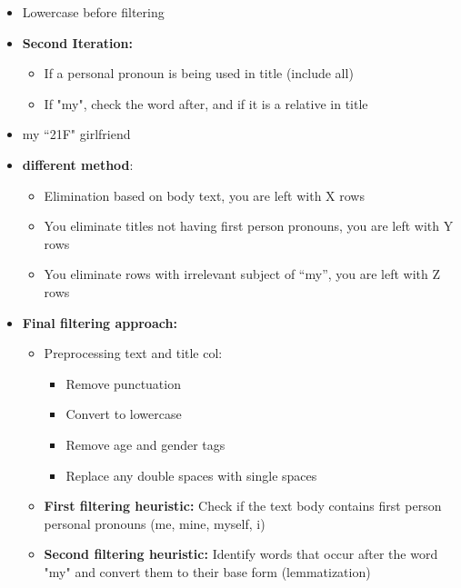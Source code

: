 \documentclass[letterpaper, 10pt]{article}
\begin{document}
\begin{itemize}
    \item Lowercase before filtering
    
    \item \textbf{Second Iteration:}
    \begin{itemize}
        \item If a personal pronoun is being used in title (include all)
        \item If "my", check the word after, and if it is a relative in title
    \end{itemize}

    \item my ``21F" girlfriend
    \item \textbf{different method}: 
    \begin{itemize}
        \item Elimination based on body text, you are left with X rows 
        \item You eliminate titles not having first person pronouns, you are left with Y rows
        \item You eliminate rows with irrelevant subject of ``my'', you are left with Z rows 
    \end{itemize}

    \item \textbf{Final filtering approach:}
    \begin{itemize}
        \item Preprocessing text and title col: 
        \begin{itemize}
            \item  Remove punctuation
            \item Convert to lowercase
            \item Remove age and gender tags
            \item Replace any double spaces with single spaces
        \end{itemize}
        \item \textbf{First filtering heuristic:} Check if the text body contains first person personal pronouns (me, mine, myself, i)
        \item \textbf{Second filtering heuristic:} Identify words that occur after the word "my" and convert them to their base form (lemmatization)
    \end{itemize}
\end{itemize}
\end{document}
